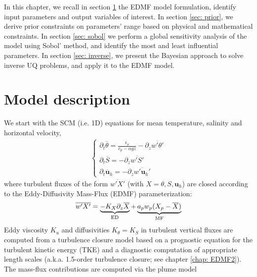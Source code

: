 \documentclass[draft]{agujournal2019}
\begin{document}
\par In this chapter, we recall in section \ref{sec: model description} the EDMF model formulation, identify input parameters and output variables of interest. In section \ref{sec: prior}, we derive prior constraints on parameters' range based on physical and mathematical constraints. In section \ref{sec: sobol} we perform a global sensitivity analysis of the model using Sobol' method, and identify the most and least influential parameters. In section \ref{sec: inverse}, we present the Bayesian approach to solve inverse UQ problems, and apply it to the EDMF model. 
%
%
\section{Model description}\label{sec: model description}
%
We start with the SCM (i.e. 1D) equations for mean temperature, salinity and horizontal velocity, 
%
\begin{eqnarray*}
    \begin{cases}
        \partial_t \overline{\theta} = \frac{\overline{\epsilon}_\nu }{c_p - \alpha gz } - \partial_z \overline{w' \theta'} \label{eq:temp budget}
        \\
        \partial_t \overline{S} = - \partial_z \overline{w' S'}
        \\
        \partial_t \overline{\bm u}_h = - \partial_z \overline{w' \bm u_h'} 
    \end{cases}
\end{eqnarray*}
%
where turbulent fluxes of the form $\overline{w'X'}$ (with $X=\theta,S,\bm u_h$) are closed according to the Eddy-Diffusivity Mass-Flux (EDMF) parameterization:
%
\begin{eqnarray*}
    \overline{w'X'} = \underbrace{-K_X \partial_z \overline{X}}_{\rm{ED}} + \underbrace{a_p w_p (X_p - \overline{X})}_{\rm{MF}}
\end{eqnarray*}
%
Eddy viscosity $K_u$ and diffusivities $K_\theta=K_S$ 
in turbulent vertical fluxes are computed from a turbulence closure model based on a 
prognostic equation for the turbulent kinetic energy (TKE) and a diagnostic 
computation of appropriate length scales (a.k.a. 1.5-order turbulence closure; see chapter \ref{chap: EDMF2}). The mass-flux contributions are computed via the plume model
%
\end{document}
